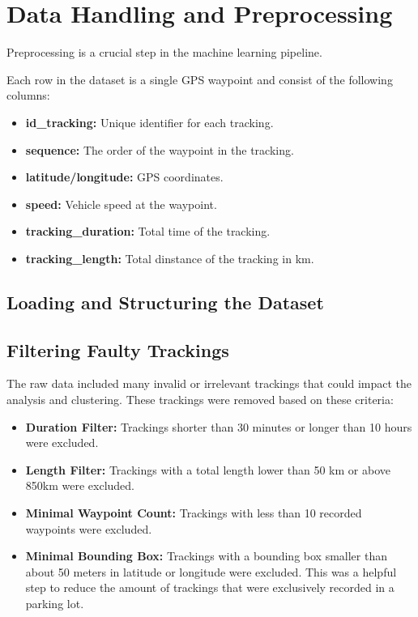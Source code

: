 \documentclass[a4paper,12pt,twoside]{scrreprt}
\begin{document}
\section{Data Handling and Preprocessing}
Preprocessing is a crucial step in the machine learning pipeline.

Each row in the dataset is a single GPS waypoint and consist of the following
columns:

\begin{itemize}
  \item \textbf{id\_tracking:} Unique identifier for each tracking.
  \item \textbf{sequence:} The order of the waypoint in the tracking.
  \item \textbf{latitude/longitude:} GPS coordinates.
  \item \textbf{speed:} Vehicle speed at the waypoint.
  \item \textbf{tracking\_duration:} Total time of the tracking.
  \item \textbf{tracking\_length:} Total dinstance of the tracking in km.
\end{itemize}

\subsection{Loading and Structuring the Dataset}

\subsection{Filtering Faulty Trackings}
The raw data included many invalid or irrelevant trackings that could impact
the analysis and clustering. These trackings were removed based on these
criteria:

\begin{itemize}
  \item \textbf{Duration Filter:} Trackings shorter than 30 minutes or longer
        than 10 hours were excluded.
  \item \textbf{Length Filter:} Trackings with a total length lower than 50 km
        or above 850km were excluded.
  \item \textbf{Minimal Waypoint Count:} Trackings with less than 10 recorded
        waypoints were excluded.
  \item \textbf{Minimal Bounding Box:} Trackings with a bounding box smaller
        than about 50 meters in latitude or longitude were excluded. This was a
        helpful
        step to reduce the amount of trackings that were exclusively recorded
        in a
        parking lot.
\end{itemize}
\end{document}
